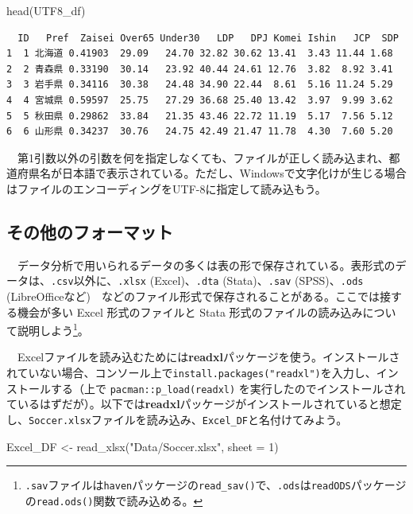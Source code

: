 \documentclass[
  a4paper,
  pandoc,
  ja=standard,
  jafont=haranoaji]{bxjsbook}
\newenvironment{Shaded}{\begin{snugshade}}{\end{snugshade}}
\newcommand{\AttributeTok}[1]{\textcolor[rgb]{0.00,0.48,0.65}{#1}}
\newcommand{\DecValTok}[1]{\textcolor[rgb]{0.68,0.00,0.00}{#1}}
\newcommand{\FunctionTok}[1]{\textcolor[rgb]{0.28,0.35,0.67}{#1}}
\newcommand{\NormalTok}[1]{\textcolor[rgb]{0.00,0.48,0.65}{#1}}
\newcommand{\OtherTok}[1]{\textcolor[rgb]{0.00,0.48,0.65}{#1}}
\newcommand{\StringTok}[1]{\textcolor[rgb]{0.13,0.47,0.30}{#1}}
\begin{document}
\begin{Shaded}
\begin{Highlighting}[numbers=left,,]
\FunctionTok{head}\NormalTok{(UTF8\_df)}
\end{Highlighting}
\end{Shaded}

\begin{verbatim}
  ID   Pref  Zaisei Over65 Under30   LDP   DPJ Komei Ishin   JCP  SDP
1  1 北海道 0.41903  29.09   24.70 32.82 30.62 13.41  3.43 11.44 1.68
2  2 青森県 0.33190  30.14   23.92 40.44 24.61 12.76  3.82  8.92 3.41
3  3 岩手県 0.34116  30.38   24.48 34.90 22.44  8.61  5.16 11.24 5.29
4  4 宮城県 0.59597  25.75   27.29 36.68 25.40 13.42  3.97  9.99 3.62
5  5 秋田県 0.29862  33.84   21.35 43.46 22.72 11.19  5.17  7.56 5.12
6  6 山形県 0.34237  30.76   24.75 42.49 21.47 11.78  4.30  7.60 5.20
\end{verbatim}

　第1引数以外の引数を何を指定しなくても、ファイルが正しく読み込まれ、都道府県名が日本語で表示されている。ただし、Windowsで文字化けが生じる場合はファイルのエンコーディングをUTF-8に指定して読み込もう。

\hypertarget{ux305dux306eux4ed6ux306eux30d5ux30a9ux30fcux30deux30c3ux30c8}{%
\subsection{その他のフォーマット}\label{ux305dux306eux4ed6ux306eux30d5ux30a9ux30fcux30deux30c3ux30c8}}

　データ分析で用いられるデータの多くは表の形で保存されている。表形式のデータは、\texttt{.csv}以外に、\texttt{.xlsx}
(Excel)、\texttt{.dta} (Stata)、\texttt{.sav} (SPSS)、\texttt{.ods}
(LibreOfficeなど)　などのファイル形式で保存されることがある。ここでは接する機会が多い
Excel 形式のファイルと Stata
形式のファイルの読み込みについて説明しよう\footnote{\texttt{.sav}ファイルは\texttt{haven}パッケージの\texttt{read\_sav()}で、\texttt{.ods}は\texttt{readODS}パッケージの\texttt{read.ods()}関数で読み込める。}。

　Excelファイルを読み込むためには\textbf{readxl}パッケージを使う。インストールされていない場合、コンソール上で\texttt{install.packages("readxl")}を入力し、インストールする（上で
\texttt{pacman::p\_load(readxl)}
を実行したのでインストールされているはずだが）。以下では\textbf{readxl}パッケージがインストールされていると想定し、\texttt{Soccer.xlsx}ファイルを読み込み、\texttt{Excel\_DF}と名付けてみよう。

\begin{Shaded}
\begin{Highlighting}[numbers=left,,]
\NormalTok{Excel\_DF }\OtherTok{\textless{}{-}} \FunctionTok{read\_xlsx}\NormalTok{(}\StringTok{"Data/Soccer.xlsx"}\NormalTok{, }\AttributeTok{sheet =} \DecValTok{1}\NormalTok{)}
\end{Highlighting}
\end{Shaded}
\end{document}
